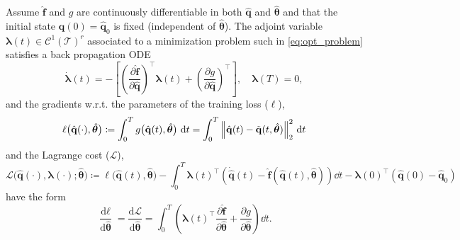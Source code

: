 \begin{theorem}
    \label{thm:adjoint_method}
    Assume $\hat{\mathbf{f}}$ and $g$ are continuously differentiable in both $\hat{\mathbf{q}}$ and $\hat{\bm{\theta}}$ and that the initial state $\hat{\mathbf{q}}(0)=\hat{\mathbf{q}}_0$ is fixed (independent of $\hat{\bm{\theta}}$). The adjoint variable $\bm{\lambda}(t)\in\mathcal{C}^1(\mathcal{T})^r$ associated to a minimization problem such in \eqref{eq:opt_problem} satisfies a back propagation ODE\\ 
    \begin{equation}
        \dot{\bm{\lambda}}(t) = -\left[ \left(\dfrac{\partial \hat{\mathbf{f}}}{\partial\hat{\mathbf{q}}}\right)^{\top}\bm{\lambda}(t) + \left( \dfrac{\partial g}{\partial \hat{\mathbf{q}}} \right)^{\top} \right],\quad\bm{\lambda}(T)=0,
        \label{eq:adjoint_eqs}
    \end{equation}
    and the gradients w.r.t. the parameters of the training loss ($\ell$),\\
    \begin{equation*}
        \ell\bigl(\hat{\mathbf{q}}(\cdot),\hat{\bm{\theta}}\bigr) \coloneqq \displaystyle\int_0^T g\bigl(\hat{\mathbf{q}}(t),\hat{\bm{\theta}}\bigr)~\dd t = \int_0^T \norm{\hat{\mathbf{q}}(t) - \tilde{\mathbf{q}}(t, \hat{\bm{\theta}})}_2^2~\dd t
    \end{equation*}
    and the Lagrange cost ($\mathscr{L}$),\\
    \begin{equation*}
        \mathscr{L}\bigl(\hat{\mathbf{q}}(\cdot),\bm{\lambda}(\cdot);\hat{\bm{\theta}}\bigr) \coloneqq \ell\bigl(\hat{\mathbf{q}}(t),\hat{\bm{\theta}}\bigr) - \int_0^T \bm{\lambda}(t)^{\top}\left( \dot{\hat{\mathbf{q}}}(t)-\hat{\mathbf{f}}(\hat{\mathbf{q}}(t),\hat{\bm{\theta}}) \right)\dd t - \bm{\lambda}(0)^{\top}(\hat{\mathbf{q}}(0)-\hat{\mathbf{q}}_0)
        \label{eq:lagrange_cost}
    \end{equation*}
    have the form\\
    \begin{equation}
        \dfrac{\textrm{d} \ell}{\textrm{d} \hat{\bm{\theta}}} = \dfrac{\textrm{d} \mathscr{L}}{\textrm{d}\hat{\bm{\theta}}} = \int_0^T \left(\bm{\lambda}(t)^{\top}\dfrac{\partial\hat{\mathbf{f}}}{\partial\hat{\bm{\theta}}} + \dfrac{\partial g}{\partial\hat{\bm{\theta}}} \right)\dd t.
        \label{eq:gradient_lagrange}
    \end{equation}
\end{theorem}

